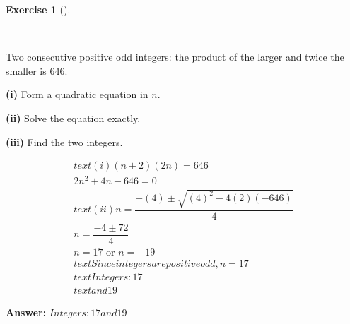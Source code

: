 \documentclass[
  letterpaper,
  DIV=11,
  numbers=noendperiod]{scrreprt}
\theoremstyle{definition}
\newtheorem{exercise}{Exercise}[chapter]
\theoremstyle{remark}
\begin{document}
\begin{exercise}[]\protect\hypertarget{exr-u6-26-2}{}\label{exr-u6-26-2}

~

Two consecutive positive odd integers: the product of the larger and
twice the smaller is 646.

\textbf{(i)} Form a quadratic equation in \(n\).

\textbf{(ii)} Solve the equation exactly.

\textbf{(iii)} Find the two integers.

\begin{tcolorbox}[enhanced jigsaw, opacitybacktitle=0.6, coltitle=black, arc=.35mm, colframe=quarto-callout-tip-color-frame, colback=white, bottomrule=.15mm, left=2mm, colbacktitle=quarto-callout-tip-color!10!white, titlerule=0mm, opacityback=0, title=\textcolor{quarto-callout-tip-color}{\faLightbulb}\hspace{0.5em}{🔍 View Solution}, leftrule=.75mm, breakable, rightrule=.15mm, bottomtitle=1mm, toptitle=1mm, toprule=.15mm]

\begin{align*}
text{(i) } (n+2)(2n) = 646 \\ 2n^2 + 4n - 646 = 0 \\ text{(ii) } n = \dfrac{-(4) \pm \sqrt{(4)^2 - 4(2)(-646)}}{4} \\ n = \dfrac{-4 \pm 72}{4} \\ n = 17 \text{ or } n = -19 \\ text{Since integers are positive odd, } n = 17 \\ text{Integers: } 17 \\ text{ and } 19
\end{align*}

\textbf{Answer:} \(Integers: 17 and 19\)

\end{tcolorbox}

\end{exercise}
\end{document}
